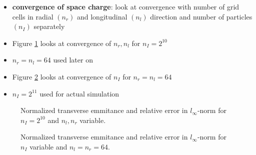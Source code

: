 \begin{itemize}
   \item \textbf{convergence of space charge}: look at convergence with number of grid cells in radial $(n_r)$ and longitudinal $(n_l)$ direction and number of particles $(n_I)$ separately

   \item Figure \ref{fig:sc_cvg_rl} looks at convergence of $n_r, n_l$ for $n_I=2^{10}$
   \item $n_r=n_l=64$ used later on

   \item Figure \ref{fig:sc_cvg_I} looks at convergence of $n_I$ for $n_r=n_l=64$
   \item $n_I=2^{11}$ used for actual simulation
\end{itemize}

\begin{center}
\begin{figure}[H]
   \begin{subfigure}{0.4\textwidth}
      
   \end{subfigure}
   \qquad \qquad \qquad
   \begin{subfigure}{0.4\textwidth}
      
   \end{subfigure}
   \caption{Normalized transverse emmitance and relative error in $l_\infty$-norm for $n_I=2^{10}$ and $n_l, n_r$ variable.}
   \label{fig:sc_cvg_rl}
\end{figure}
\end{center}

\begin{center}
\begin{figure}[H]
   \begin{subfigure}{0.4\textwidth}
      
   \end{subfigure}
   \qquad \qquad \qquad
   \begin{subfigure}{0.4\textwidth}
      
   \end{subfigure}
   \caption{Normalized transverse emmitance and relative error in $l_\infty$-norm for $n_I$ variable and $n_l=n_r=64$.}
   \label{fig:sc_cvg_I}
\end{figure}
\end{center}

%       
%       


